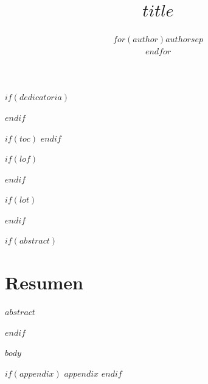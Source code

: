 \documentclass[oneside,11pt]{Latex/Classes/PhDthesisPSnPDF}
\title{$title$}
\author{$for(author)$$author$$sep$ \\ $endfor$}
\begin{document}
\maketitle

\frontmatter

$if(dedicatoria)$

$endif$

\setcounter{secnumdepth}{3}
\setcounter{tocdepth}{3}

$if(toc)$
\tableofcontents
$endif$

$if(lof)$
\listoffigures
$endif$

$if(lot)$
\listoftables
$endif$

\cleardoublepage

$if(abstract)$
  \cleardoublepage       %
  \chapter*{Resumen}     %
  
  $abstract$             %
  
  \cleardoublepage
$endif$

\mainmatter
\def\baselinestretch{1.5}

$body$

\renewcommand{\bibname}{Lista de Referencias}
 
 

$if(appendix)$
\appendix
$appendix$
$endif$
\end{document}
